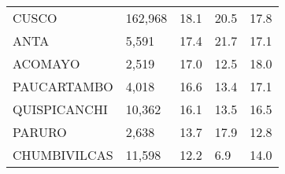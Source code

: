 \begin{tabular}{lllll}
	\cellcolor[HTML]{FF5050}CUSCO                                  & 162,968                                                               & 18.1                                                                             & 20.5                                                                        & 17.8                                                                                \\
	\cellcolor[HTML]{FF5050}ANTA                                   & 5,591                                                                 & 17.4                                                                             & 21.7                                                                        & 17.1                                                                                \\
	\cellcolor[HTML]{FF5050}ACOMAYO                                & 2,519                                                                 & 17.0                                                                             & 12.5                                                                        & 18.0                                                                                \\
	\cellcolor[HTML]{FF5050}PAUCARTAMBO                            & 4,018                                                                 & 16.6                                                                             & 13.4                                                                        & 17.1                                                                                \\
	\cellcolor[HTML]{FF5050}QUISPICANCHI                           & 10,362                                                                & 16.1                                                                             & 13.5                                                                        & 16.5                                                                                \\
	\cellcolor[HTML]{FF5050}PARURO                                 & 2,638                                                                 & 13.7                                                                             & 17.9                                                                        & 12.8                                                                                \\
	\cellcolor[HTML]{FF5050}CHUMBIVILCAS                           & 11,598                                                                & 12.2                                                                             & 6.9                                                                         & 14.0                                                                                \\

\end{tabular}
